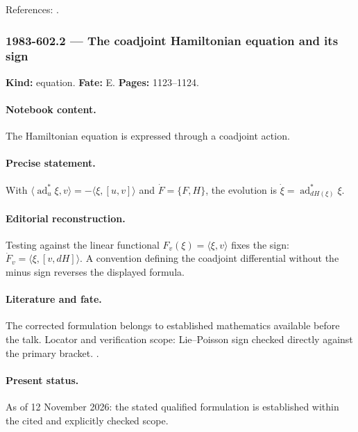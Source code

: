 \noindent References: \citep{morrison1980maxwell}.\par

\subsubsection{1983-602.2 --- The coadjoint Hamiltonian equation and its sign}

\label{item:1983-602.2}

\noindent\textbf{Kind:} equation. \textbf{Fate:} E. \textbf{Pages:} 1123--1124.\par

\paragraph{Notebook content.} The Hamiltonian equation is expressed through a coadjoint action.

\paragraph{Precise statement.} With \(\langle\operatorname{ad}_u^*\xi,v\rangle=-\langle\xi,[u,v]\rangle\) and \(\dot F=\{F,H\}\), the evolution is \(\dot\xi=\operatorname{ad}_{dH(\xi)}^*\xi\).

\paragraph{Editorial reconstruction.} Testing against the linear functional \(F_v(\xi)=\langle\xi,v\rangle\) fixes the sign: \(\dot F_v=\langle\xi,[v,dH]\rangle\). A convention defining the coadjoint differential without the minus sign reverses the displayed formula.

\paragraph{Literature and fate.} The corrected formulation belongs to established mathematics available before the talk. Locator and verification scope: Lie--Poisson sign checked directly against the primary bracket. \cite{morrison1980maxwell}.

\paragraph{Present status.} As of 12 November 2026: the stated qualified formulation is established within the cited and explicitly checked scope.

